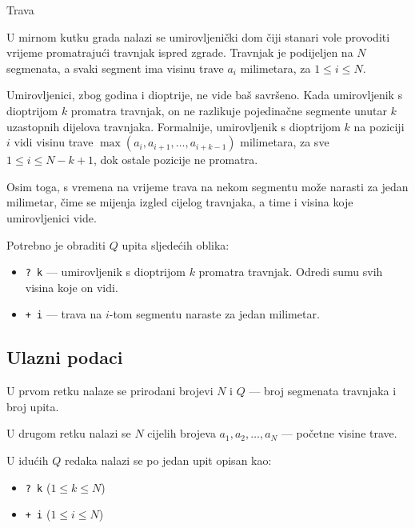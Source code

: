 \begin{statement}[
  problempoints=100,
  timelimit=3.5 sekundi,
  memorylimit=512 MiB,
]{Trava}\

U mirnom kutku grada nalazi se umirovljenički dom čiji stanari vole provoditi vrijeme promatrajući travnjak ispred zgrade. Travnjak je podijeljen na $N$ segmenata, a svaki segment ima visinu trave $a_i$ milimetara, za $1 \leq i \leq N$.

Umirovljenici, zbog godina i dioptrije, ne vide baš savršeno. Kada umirovljenik s dioptrijom $k$ promatra travnjak, on ne razlikuje pojedinačne segmente unutar $k$ uzastopnih dijelova travnjaka. Formalnije, umirovljenik s dioptrijom $k$ na poziciji $i$ vidi visinu trave $\max(a_i, a_{i+1}, \ldots, a_{i+k-1})$ milimetara, za sve $1 \leq i \leq N - k + 1$, dok ostale pozicije ne promatra.

Osim toga, s vremena na vrijeme trava na nekom segmentu može narasti za jedan milimetar, čime se mijenja izgled cijelog travnjaka, a time i visina koje umirovljenici vide.

Potrebno je obraditi $Q$ upita sljedećih oblika:
\vspace{-0.7em}
\begin{itemize}
    \item \texttt{\frenchspacing? k} — umirovljenik s dioptrijom $k$ promatra travnjak. Odredi sumu svih visina koje on vidi.
    \item \texttt{+ i} — trava na $i$-tom segmentu naraste za jedan milimetar.
\end{itemize}

\subsection*{Ulazni podaci}

U prvom retku nalaze se prirodani brojevi $N$ i $Q$ — broj segmenata travnjaka i broj upita.

U drugom retku nalazi se $N$ cijelih brojeva $a_1, a_2, \ldots, a_N$ — početne visine trave.

U idućih $Q$ redaka nalazi se po jedan upit opisan kao:
\vspace{-0.7em}
\begin{itemize}
    \item \texttt{\frenchspacing? k} ($1 \leq k \leq N$)
    \item \texttt{+ i} ($1 \leq i \leq N$)
\end{itemize}


\end{statement}
